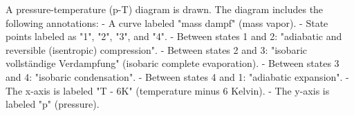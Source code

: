 A pressure-temperature (p-T) diagram is drawn. The diagram includes the following annotations:  
- A curve labeled "mass dampf" (mass vapor).  
- State points labeled as "1", "2", "3", and "4".  
- Between states 1 and 2: "adiabatic and reversible (isentropic) compression".  
- Between states 2 and 3: "isobaric vollständige Verdampfung" (isobaric complete evaporation).  
- Between states 3 and 4: "isobaric condensation".  
- Between states 4 and 1: "adiabatic expansion".  
- The x-axis is labeled "T - 6K" (temperature minus 6 Kelvin).  
- The y-axis is labeled "p" (pressure).